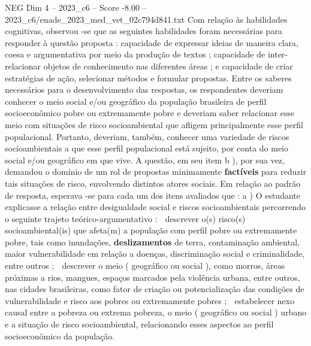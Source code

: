 \begin{textsample}{NEG Dim 4 – 2023\_c6 – Score -8.00 – 2023\_c6/enade\_2023\_med\_vet\_02c794d841.txt}
Com relação às habilidades cognitivas, observou -se que as seguintes habilidades foram necessárias para responder à questão proposta : capacidade de expressar ideias de maneira clara, coesa e argumentativa por meio da produção de textos ; capacidade de inter-relacionar objetos de conhecimento nas diferentes áreas ; e capacidade de criar estratégias de ação, selecionar métodos e formular propostas.
Entre os saberes necessários para o desenvolvimento das respostas, os respondentes deveriam conhecer o meio social e/ou geográfico da população brasileira de perfil socioeconômico pobre ou extremamente pobre e deveriam saber relacionar esse meio com situações de risco socioambiental que afligem principalmente esse perfil populacional.
Portanto, deveriam, também, conhecer uma variedade de riscos socioambientais a que esse perfil populacional está sujeito, por conta do meio social e/ou geográfico em que vive.
A questão, em seu item b ), por sua vez, demandou o domínio de um rol de propostas minimamente \textbf{factíveis} para reduzir tais situações de risco, envolvendo distintos atores sociais.
Em relação ao padrão de resposta, esperava -se para cada um dos itens avaliados que : a ) O estudante explicasse a relação entre desigualdade social e riscos socioambientais percorrendo o seguinte trajeto teórico-argumentativo :  descrever o(s) risco(s) socioambiental(is) que afeta(m) a população com perfil pobre ou extremamente pobre, tais como inundações, \textbf{deslizamentos} de terra, contaminação ambiental, maior vulnerabilidade em relação a doenças, discriminação social e criminalidade, entre outros ;  descrever o meio ( geográfico ou social ), como morros, áreas próximas a rios, mangues, espaços marcados pela violência urbana, entre outros, nas cidades brasileiras, como fator de criação ou potencialização das condições de vulnerabilidade e risco aos pobres ou extremamente pobres ;  estabelecer nexo causal entre a pobreza ou extrema pobreza, o meio ( geográfico ou social ) urbano e a situação de risco socioambiental, relacionando esses aspectos ao perfil socioeconômico da população.

\end{textsample}
